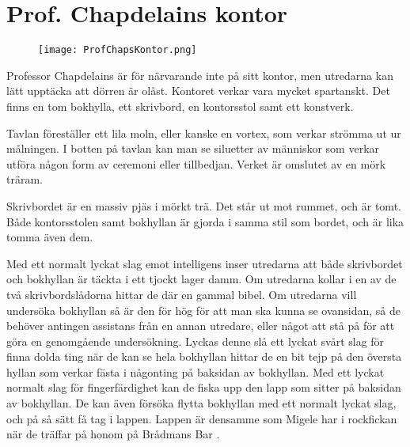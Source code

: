 \section{Prof. Chapdelains kontor}
\label{loc:ChapdelainsKontor}
%
\begin{figure}[h]
\texttt{[image: ProfChapsKontor.png]}
\centering
\end{figure}
%
Professor Chapdelains är för närvarande inte på sitt kontor, men utredarna kan lätt upptäcka att dörren är olåst. Kontoret verkar vara mycket spartanskt. Det finns en tom bokhylla, ett skrivbord, en kontorsstol samt ett konstverk.

\begin{displayquote}
	Tavlan föreställer ett lila moln, eller kanske en vortex, som verkar strömma ut ur målningen. I botten på tavlan kan man se siluetter av människor som verkar utföra någon form av ceremoni eller tillbedjan. Verket är omslutet av en mörk träram.
\end{displayquote}

\begin{displayquote}
	Skrivbordet är en massiv pjäs i mörkt trä. Det står ut mot rummet, och är tomt. Både kontorsstolen samt bokhyllan är gjorda i samma stil som bordet, och är lika tomma även dem.
\end{displayquote}
%
Med ett normalt lyckat slag emot intelligens inser utredarna att både skrivbordet och bokhyllan är täckta i ett tjockt lager damm. Om utredarna kollar i en av de två skrivbordslådorna hittar de där en gammal bibel. Om utredarna vill undersöka bokhyllan så är den för hög för att man ska kunna se ovansidan, så de behöver antingen assistans från en annan utredare, eller något att stå på för att göra en genomgående undersökning. Lyckas denne slå ett lyckat svårt slag för finna dolda ting när de kan se hela bokhyllan hittar de en bit tejp på den översta hyllan som verkar fästa i någonting på baksidan av bokhyllan. Med ett lyckat normalt slag för fingerfärdighet kan de fiska upp den lapp som sitter på baksidan av bokhyllan. De kan även försöka flytta bokhyllan med ett normalt lyckat slag, och på så sätt få tag i lappen. Lappen är densamme som Migele har i rockfickan när de träffar på honom på Brådmans Bar \sectiondescribe{\ref{loc:BradmansBar}}.
